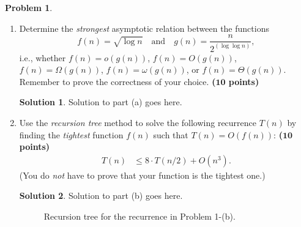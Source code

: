 \documentclass{article}
\theoremstyle{definition}
\newtheorem{problem}{Problem}
\newtheorem*{solution*}{Solution}
\newenvironment{solution}{\begin{solution*}}{{} \end{solution*}}
\newcommand{\grade}[1]{\hfill{\textbf{($\mathbf{#1}$ points)}}}
\begin{document}
\begin{problem}\label{basics}~
\begin{enumerate}[label=(\alph*)]
	\item Determine the \emph{strongest} asymptotic relation between the functions 
	\[
	f(n) = \sqrt{\log{n}} \quad \text{and} \quad g(n) = \frac{n}{2^{(\log\log{n})}},
	\]
	i.e., whether $f(n) = o(g(n))$, $f(n) = O(g(n))$, $f(n) = \Omega(g(n))$, $f(n) = \omega(g(n))$, or $f(n) = \Theta(g(n))$. 
	Remember to prove the correctness of your choice. \grade{10}

\bigskip
\begin{solution}
	Solution to part (a) goes here. 
\end{solution}

	\newpage
	\item Use the \emph{recursion tree} method to solve the following recurrence $T(n)$ by finding the \emph{tightest} function $f(n)$ such that $T(n) = O(f(n))$:   \grade{10}
	\begin{align*}
		T(n) &\leq 8 \cdot T(n/2) + O(n^3). 
	\end{align*} 
	(You do \emph{not} have to prove that your function is the tightest one.) 
	\bigskip
	\begin{solution}
	Solution to part (b) goes here. 
	\begin{figure}[h!]
			\centering
		\caption{Recursion tree for the recurrence in Problem 1-(b).} 
	\end{figure}
\end{solution}

\end{enumerate}
\end{problem}

\newpage
\end{document}
